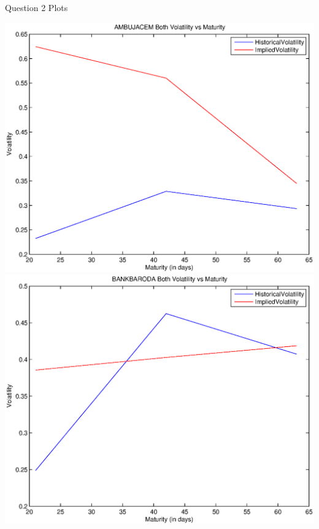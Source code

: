 \documentclass{article}
\begin{document}
\graphicspath{ {plots/}}
\Large  Question 2 Plots

\includegraphics[width=\textwidth]{AMBUJACEM_Both_Volatility_vs_Maturity} \\               
\includegraphics[width=\textwidth]{BANKBARODA_Both_Volatility_vs_Maturity} \\
\end{document}

